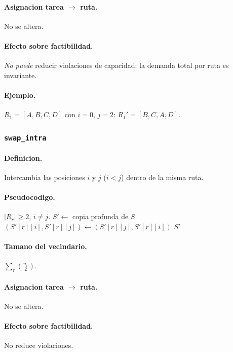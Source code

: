 \documentclass[11pt,a4paper]{article}
\newcommand{\op}[1]{\texttt{#1}}
\begin{document}
\paragraph{Asignacion tarea $\to$ ruta.} No se altera.

\paragraph{Efecto sobre factibilidad.} \emph{No puede} reducir
violaciones de capacidad: la demanda total por ruta es invariante.

\paragraph{Ejemplo.} $R_1=[A,B,C,D]$ con $i=0$, $j=2$:
$R_1' = [B,C,A,D]$.

\subsubsection{\op{swap\_intra}}

\paragraph{Definicion.} Intercambia las posiciones $i$ y $j$ ($i<j$)
dentro de la misma ruta.

\paragraph{Pseudocodigo.}
\begin{algorithm}[H]
\caption{\op{swap\_intra}($S, r, i, j$)}
\begin{algorithmic}[1]
\Require $|R_r|\ge 2$, $i\neq j$.
\State $S' \gets$ copia profunda de $S$
\State $(S'[r][i], S'[r][j]) \gets (S'[r][j], S'[r][i])$
\State \Return $S'$
\end{algorithmic}
\end{algorithm}

\paragraph{Tamano del vecindario.}
$\sum_r \binom{n_r}{2}$.

\paragraph{Asignacion tarea $\to$ ruta.} No se altera.

\paragraph{Efecto sobre factibilidad.} No reduce violaciones.
\end{document}
